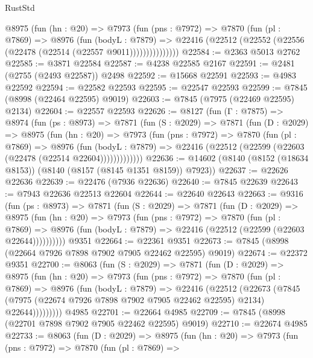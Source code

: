 \begin{lexlean}{RustStd}
\begin{coremodule}
            @8975
              (fun (hn : @20) =>
              @7973
                (fun (pns : @7972) =>
                @7870
                  (fun (pl : @7869) =>
                  @8976
                    (fun (bodyL : @7879) =>
                    @22416 (@22512 (@22552 (@22556 (@22478 (@22514 (@22557 @9011)))))))))))))))
@22584 := @2363 @5013 @2762
@22585 := @3871 @22584
@22587 := @4238 @22585 @2167
@22591 := @2481 (@2755 (@2493 @22587)) @2498
@22592 := @15668 @22591
@22593 := @4983 @22592
@22594 := @22582 @22593
@22595 := @22547 @22593
@22599 := @7845 (@8998 (@22464 @22595) @9019)
@22603 := @7845 (@7975 (@22469 @22595) @2134)
@22604 := @22557 @22593
@22626 := @8127
    (fun (Γ : @7875) =>
    @8974
      (fun (ps : @8973) =>
      @7871
        (fun (S : @2029) =>
        @7871
          (fun (D : @2029) =>
          @8975
            (fun (hn : @20) =>
            @7973
              (fun (pns : @7972) =>
              @7870
                (fun (pl : @7869) =>
                @8976
                  (fun (bodyL : @7879) =>
                  @22416 (@22512 (@22599 (@22603 (@22478 (@22514 @22604)))))))))))))
@22636 := @14602 (@8140 (@8152 (@18634 @8153)) (@8140 (@8157 (@8145 @1351 @8159)) @7923))
@22637 := @22626 @22636
@22639 := @22476 (@7936 @22636)
@22640 := @7845 @22639
@22643 := @7943 @22636 @22513 @22604
@22644 := @22640 @22643
@22663 := @9316
    (fun (ps : @8973) =>
    @7871
      (fun (S : @2029) =>
      @7871
        (fun (D : @2029) =>
        @8975
          (fun (hn : @20) =>
          @7973
            (fun (pns : @7972) =>
            @7870
              (fun (pl : @7869) =>
              @8976 (fun (bodyL : @7879) => @22416 (@22512 (@22599 (@22603 @22644))))))))))
    @9351
@22664 := @22361 @9351
@22673 := @7845 (@8998 (@22664 @7926 @7898 @7902 @7905 @22462 @22595) @9019)
@22674 := @22372 @9351
@22700 := @8063
    (fun (S : @2029) =>
    @7871
      (fun (D : @2029) =>
      @8975
        (fun (hn : @20) =>
        @7973
          (fun (pns : @7972) =>
          @7870
            (fun (pl : @7869) =>
            @8976
              (fun (bodyL : @7879) =>
              @22416
                (@22512
                  (@22673
                    (@7845
                      (@7975 (@22674 @7926 @7898 @7902 @7905 @22462 @22595) @2134)
                      @22644)))))))))
    @4985
@22701 := @22664 @4985
@22709 := @7845 (@8998 (@22701 @7898 @7902 @7905 @22462 @22595) @9019)
@22710 := @22674 @4985
@22733 := @8063
    (fun (D : @2029) =>
    @8975
      (fun (hn : @20) =>
      @7973
        (fun (pns : @7972) =>
        @7870
          (fun (pl : @7869) =>

\end{coremodule}
\end{lexlean}
